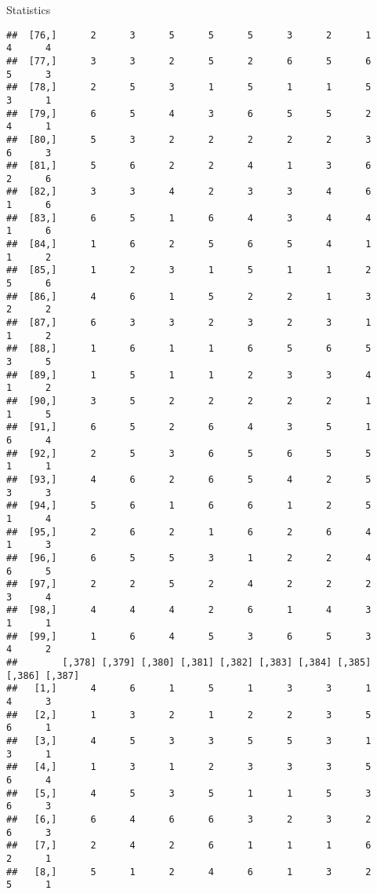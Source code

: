\documentclass[
  ignorenonframetext,
]{beamer}
\begin{document}
\begin{frame}[fragile]{Statistics}
\begin{verbatim}
##  [76,]      2      3      5      5      5      3      2      1      4      4
##  [77,]      3      3      2      5      2      6      5      6      5      3
##  [78,]      2      5      3      1      5      1      1      5      3      1
##  [79,]      6      5      4      3      6      5      5      2      4      1
##  [80,]      5      3      2      2      2      2      2      3      6      3
##  [81,]      5      6      2      2      4      1      3      6      2      6
##  [82,]      3      3      4      2      3      3      4      6      1      6
##  [83,]      6      5      1      6      4      3      4      4      1      6
##  [84,]      1      6      2      5      6      5      4      1      1      2
##  [85,]      1      2      3      1      5      1      1      2      5      6
##  [86,]      4      6      1      5      2      2      1      3      2      2
##  [87,]      6      3      3      2      3      2      3      1      1      2
##  [88,]      1      6      1      1      6      5      6      5      3      5
##  [89,]      1      5      1      1      2      3      3      4      1      2
##  [90,]      3      5      2      2      2      2      2      1      1      5
##  [91,]      6      5      2      6      4      3      5      1      6      4
##  [92,]      2      5      3      6      5      6      5      5      1      1
##  [93,]      4      6      2      6      5      4      2      5      3      3
##  [94,]      5      6      1      6      6      1      2      5      1      4
##  [95,]      2      6      2      1      6      2      6      4      1      3
##  [96,]      6      5      5      3      1      2      2      4      6      5
##  [97,]      2      2      5      2      4      2      2      2      3      4
##  [98,]      4      4      4      2      6      1      4      3      1      1
##  [99,]      1      6      4      5      3      6      5      3      4      2
##        [,378] [,379] [,380] [,381] [,382] [,383] [,384] [,385] [,386] [,387]
##   [1,]      4      6      1      5      1      3      3      1      4      3
##   [2,]      1      3      2      1      2      2      3      5      6      1
##   [3,]      4      5      3      3      5      5      3      1      3      1
##   [4,]      1      3      1      2      3      3      3      5      6      4
##   [5,]      4      5      3      5      1      1      5      3      6      3
##   [6,]      6      4      6      6      3      2      3      2      6      3
##   [7,]      2      4      2      6      1      1      1      6      2      1
##   [8,]      5      1      2      4      6      1      3      2      5      1

\end{verbatim}
\end{frame}
\end{document}
